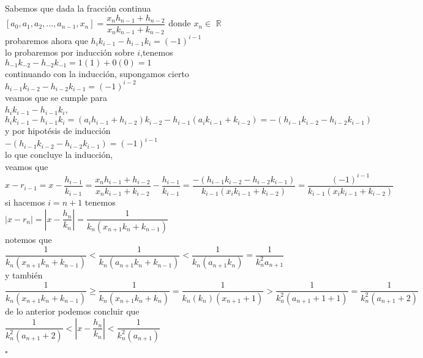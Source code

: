 \documentclass[11pt, article]{memoir}
\begin{document}
Sabemos que dada la fracción continua\\
$[a_{0},a_{1},a_{2},...,a_{n-1},x_{n}]=\dfrac{x_{n}h_{n-1}+h_{n-2}}{x_{n}k_{n-1}+k_{n-2}}$ donde $x_{n} \in $ $\mathbb{R}$\\
probaremos ahora que $h_{i}k_{i-1}-h_{i-1}k_{i}=(-1)^{i-1}$\\
lo probaremos por inducción sobre $i$,tenemos\\
$h_{-1}k_{-2}-h_{-2}k_{-1}=1(1)+0(0)=1$\\
continuando con la inducción, supongamos cierto\\
$h_{i-1}k_{i-2}-h_{i-2}k_{i-1}=(-1)^{i-2}$\\
veamos que se cumple para\\
$h_{i}k_{i-1}-h_{i-1}k_{i}$,\\
$h_{i}k_{i-1}-h_{i-1}k_{i}=(a_{i}h_{i-1}+h_{i-2})k_{i-2}-h_{i-1}(a_{i}k_{i-1}+k_{i-2})=-(h_{i-1}k_{i-2}-h_{i-2}k_{i-1})$\\
y por hipotésis de inducción\\
$-(h_{i-1}k_{i-2}-h_{i-2}k_{i-1})=(-1)^{i-1}$\\
lo que concluye la inducción,\\
veamos que\\
$x-r_{i-1}=x-\dfrac{h_{i-1}}{k_{i-1}}=\dfrac{x_{n}h_{i-1}+h_{i-2}}{x_{n}k_{i-1}+k_{i-2}}-\dfrac{h_{i-1}}{k_{i-1}}=\dfrac{-(h_{i-1}k_{i-2}-h_{i-2}k_{i-1})}{k_{i-1}(x_{i}k_{i-1}+k_{i-2})}=\dfrac{(-1)^{i-1}}{k_{i-1}(x_{i}k_{i-1}+k_{i-2})}$\\
si hacemos $i=n+1$ tenemos\\
$\left|x-r_{n}\right|=\left|x-\dfrac{h_{n}}{k_{n}}\right|=\dfrac{1}{k_{n}(x_{n+1}k_{n}+k_{n-1})}$\\
notemos que\\
$\dfrac{1}{k_{n}(x_{n+1}k_{n}+k_{n-1})}<\dfrac{1}{k_{n}(a_{n+1}k_{n}+k_{n-1})}<\dfrac{1}{k_{n}(a_{n+1}k_{n})}=\dfrac{1}{k_{n}^{2}a_{n+1}}$\\
y también\\
$\dfrac{1}{k_{n}(x_{n+1}k_{n}+k_{n-1})} \geq \dfrac{1}{k_{n}(x_{n+1}k_{n}+k_{n})} = \dfrac{1}{k_{n}(k_{n})(x_{n+1}+1)}>\dfrac{1}{k_{n}^{2}(a_{n+1}+1+1)}=\dfrac{1}{k_{n}^{2}(a_{n+1}+2)}$\\
de lo anterior podemos concluir que\\
$\dfrac{1}{k_{n}^{2}(a_{n+1}+2)} < \left|x-\dfrac{h_{n}}{k_{n}}\right|< \dfrac{1}{k_{n}^{2}(a_{n+1})}$
\begin{flushright}
$\square$
\end{flushright}
\end{document}
